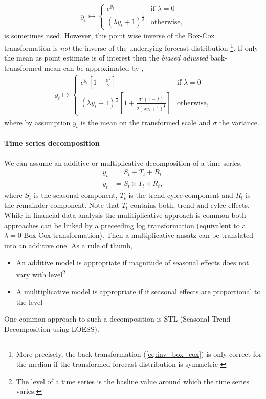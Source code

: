 \documentclass[12pt,a4paper]{article}
\begin{document}
\begin{itemize}
	\begin{align} \label{eq:inv_box_cox}
	y_t \mapsto 
	\begin{cases}
	e^{y_t} & \text{if } \lambda = 0\\ 
	(\lambda y_t + 1)^ \frac{1}{\lambda} & \text{otherwise,}
	\end{cases}	
	\end{align}
	is sometimes used. However, this point wise inverse of the Box-Cox transformation is \textit{not} the inverse of the underlying forecast distribution \footnote{More precisely, the back transformation (\ref{eq:inv_box_cox}) is only  correct for the median if the transformed forecast distribution is symmetric \cite{hyndman_forecasting_principles_2018}}. If only the mean as point estimate is of interest then the \textit{biased adjusted} back-transformed mean can be approximated by \cite{hyndman_blog_back_transform}, 
	\begin{align} \label{eq:inv_box_cox}
	y_t \mapsto 
	\begin{cases}
	e^{y_t}\left[1+\frac{\sigma^2}{2}\right] & \text{if } \lambda = 0\\ 
	(\lambda y_t + 1)^ \frac{1}{\lambda} \left[1+\frac{\sigma^2(1-\lambda)}{2(\lambda y_t + 1)^ \frac{1}{2} }\right] & \text{otherwise,}
	\end{cases}	
	\end{align}
	where by assumption $y_t$ is the mean on the transformed scale and  $\sigma$ the variance.
	  
\end{itemize}

\paragraph{Time series decomposition}
We can assume an additive or multiplicative decomposition of a time series, 
\begin{align}
	y_t &= S_t + T_t + R_t \\
	y_t &= S_t \times T_t \times R_t, 
\end{align}
where $S_t$ is the seasonal component, $T_t$ is the trend-cylce component and $R_t$ is the remainder component. Note that $T_t$ contains both, trend and cylce effects. While in financial data analysis the mulitiplicative approach is common both approaches can be linked by a preceeding log transformation (equivalent to a $\lambda =0$ Box-Cox transformation). Then a multiplicative ansatz can be translated into an additive one.  As a rule of thumb, 
\begin{itemize}
	\item An additive model is appropriate if magnitude of seasonal effects does not vary with level\footnote{The level of a time series is the basline value around which the time series varies.}
	\item A mulitiplicative model is appropriate if if seasonal effects are proportional to the level  
\end{itemize} 
One common approach to such a decomposition is STL (Seasonal-Trend Decomposition using LOESS).
\end{document}
